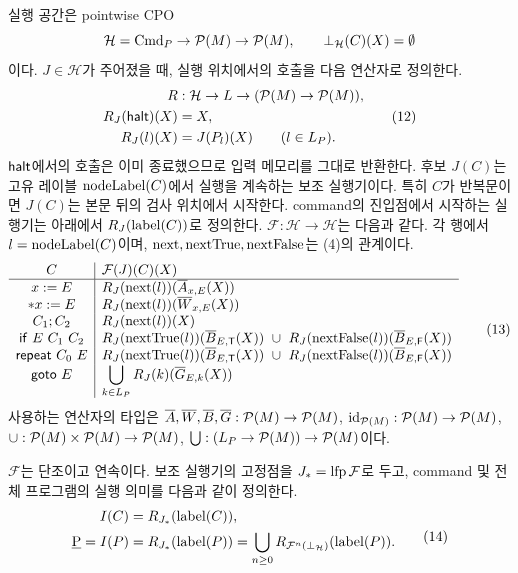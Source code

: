 \documentclass[a4paper,10pt]{article}
\begin{document}
실행 공간은 pointwise CPO
\[
 \mathcal H=\mathrm{Cmd}_P\to \mathcal P(M)\to \mathcal P(M),\qquad
 \bot_{\mathcal H}(C)(X)=\emptyset
\]
이다. $J\in\mathcal H$가 주어졌을 때, 실행 위치에서의 호출을 다음 연산자로 정의한다.
\[
\begin{aligned}
 R&:\mathcal H\to L\to(\mathcal P(M)\to \mathcal P(M)),\\
 R_J(\mathsf{halt})(X)&=X,\\
 R_J(l)(X)&=J(P_l)(X)\qquad(l\in L_P).
\end{aligned}                                                     \tag{12}
\]
$\mathsf{halt}$에서의 호출은 이미 종료했으므로 입력 메모리를 그대로 반환한다.
후보 $J(C)$는 고유 레이블 $\operatorname{nodeLabel}(C)$에서 실행을 계속하는 보조 실행기이다.
특히 $C$가 반복문이면 $J(C)$는 본문 뒤의 검사 위치에서 시작한다.
command의 진입점에서 시작하는 실행기는 아래에서 $R_J(\operatorname{label}(C))$로 정의한다.
$\mathcal F:\mathcal H\to\mathcal H$는 다음과 같다.
각 행에서 $l=\operatorname{nodeLabel}(C)$이며, $\operatorname{next},\operatorname{nextTrue},\operatorname{nextFalse}$는 (4)의 관계이다.
\[
\begin{array}{c|l}
 C&\mathcal F(J)(C)(X)\\ \hline
 x:=E&R_J(\operatorname{next}(l))(\overline{A}_{x,E}(X))\\
 *x:=E&R_J(\operatorname{next}(l))(\overline{W}_{x,E}(X))\\
 C_1;C_2&R_J(\operatorname{next}(l))(X)\\
 \mathsf{if}\ E\ C_1\ C_2&
 R_J(\operatorname{nextTrue}(l))(\overline{B}_{E,\mathsf T}(X))
 \ \cup\ R_J(\operatorname{nextFalse}(l))(\overline{B}_{E,\mathsf F}(X))\\
 \mathsf{repeat}\ C_0\ E&
 R_J(\operatorname{nextTrue}(l))(\overline{B}_{E,\mathsf T}(X))
 \ \cup\ R_J(\operatorname{nextFalse}(l))(\overline{B}_{E,\mathsf F}(X))\\
 \mathsf{goto}\ E&
 \displaystyle\bigcup_{k\in L_P}R_J(k)(\overline{G}_{E,k}(X))
\end{array}                                                       \tag{13}
\]
사용하는 연산자의 타입은 $\overline{A},\overline{W},\overline{B},\overline{G}:\mathcal P(M)\to \mathcal P(M)$,
$\operatorname{id}_{\mathcal P(M)}:\mathcal P(M)\to \mathcal P(M)$, $\cup:\mathcal P(M)\times \mathcal P(M)\to \mathcal P(M)$,
$\bigcup:(L_P\to \mathcal P(M))\to \mathcal P(M)$이다.

$\mathcal F$는 단조이고 연속이다.
보조 실행기의 고정점을 $J_*=\operatorname{lfp}\mathcal F$로 두고,
command 및 전체 프로그램의 실행 의미를 다음과 같이 정의한다.
\[
 \begin{aligned}
 I(C)&=R_{J_*}(\operatorname{label}(C)),\\
 \underbar{P}=I(P)&=R_{J_*}(\operatorname{label}(P))
   =\bigcup_{n\ge0}R_{\mathcal F^n(\bot_{\mathcal H})}(\operatorname{label}(P)).
 \end{aligned}                                                     \tag{14}
\]
\end{document}
